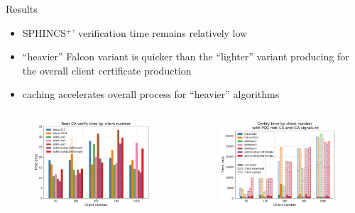 \documentclass[10pt]{beamer}
\begin{document}
\begin{frame}[allowframebreaks]{Results}
	
	\begin{itemize}
		\item SPHINCS$^+$' verification time remains relatively low
		\item ``heavier'' Falcon variant is quicker than the ``lighter'' variant producing for the overall client certificate production
		\item caching accelerates overall process for ``heavier'' algorithms
	\end{itemize}
	
	\begin{columns}[T]	
		\begin{figure}
			\includegraphics[width=\textwidth]{images/verify_means.pdf}
		\end{figure}
		\begin{figure}
			\includegraphics[width=\textwidth]{images/client_means_2PQC.pdf}
		\end{figure}
	\end{columns}
	

\end{frame}
\end{document}
